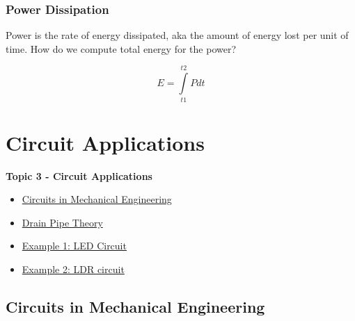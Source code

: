 \documentclass[fleqn]{ltx-talk} %
\newcommand{\sectionIIItitle}{Circuit Applications}
\newcommand{\sectionIIsubsectionIVtitle}{Power Dissipation}
\newcommand{\sectionIIIsubsectionItitle}{Circuits in Mechanical Engineering}
\newcommand{\sectionIIIsubsectionIItitle}{Drain Pipe Theory}
\newcommand{\sectionIIIsubsectionIIItitle}{Example 1: LED Circuit}
\newcommand{\sectionIIIsubsectionIVtitle}{Example 2: LDR circuit}
\begin{document}
			\begin{frame}
				\frametitle{\sectionIIsubsectionIVtitle}

				Power is the rate of energy dissipated, aka the amount of energy lost per unit of time. How do we compute total energy for the power? 
	
				\[E=\int\limits_{t1}^{t2}Pdt \]  

			\end{frame}
		
	\section{\sectionIIItitle}\label{sectionIII}

		\begin{frame}
			\large \textbf{Topic 3 - \sectionIIItitle} \vspace{3mm}\\

			\begin{itemize}
				\item \hyperref[sectionIIIsubsectionI]{\sectionIIIsubsectionItitle} \vspc %
				\item \hyperref[sectionIIIsubsectionII]{\sectionIIIsubsectionIItitle} \vspc %
				\item \hyperref[sectionIIIsubsectionIII]{\sectionIIIsubsectionIIItitle} \vspc %
				\item \hyperref[sectionIIIsubsectionIV]{\sectionIIIsubsectionIVtitle} \vspc %
			\end{itemize}

		\end{frame}

		\subsection{\sectionIIIsubsectionItitle}\label{sectionIIIsubsectionI}
\end{document}
